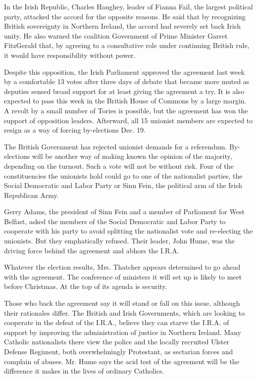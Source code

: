 In the Irish Republic, Charles Haughey, leader of Fianna Fail, the
largest political party, attacked the accord for the opposite reasons.
He said that by recognizing British sovereignty in Northern Ireland, the
accord had severely set back Irish unity. He also warned the coalition
Government of Prime Minister Garret FitzGerald that, by agreeing to a
consultative role under continuing British rule, it would have
responsibility without power.

Despite this opposition, the Irish Parliament approved the agreement
last week by a comfortable 13 votes after three days of debate that
became more muted as deputies sensed broad support for at least giving
the agreement a try. It is also expected to pass this week in the
British House of Commons by a large margin. A revolt by a small number
of Tories is possible, but the agreement has won the support of
opposition leaders. Afterward, all 15 unionist members are expected to
resign as a way of forcing by-elections Dec. 19.

The British Government has rejected unionist demands for a referendum.
By-elections will be another way of making known the opinion of the
majority, depending on the turnout. Such a vote will not be without
risk. Four of the constituencies the unionists hold could go to one of
the nationalist parties, the Social Democratic and Labor Party or Sinn
Fein, the political arm of the Irish Republican Army.

Gerry Adams, the president of Sinn Fein and a member of Parliament for
West Belfast, asked the members of the Social Democratic and Labor Party
to cooperate with his party to avoid splitting the nationalist vote and
re-electing the unionists. But they emphatically refused. Their leader,
John Hume, was the driving force behind the agreement and abhors the
I.R.A.

Whatever the election results, Mrs. Thatcher appears determined to go
ahead with the agreement. The conference of ministers it will set up is
likely to meet before Christmas. At the top of its agenda is security.

Those who back the agreement say it will stand or fall on this issue,
although their rationales differ. The British and Irish Governments,
which are looking to cooperate in the defeat of the I.R.A., believe they
can starve the I.R.A. of support by improving the administration of
justice in Northern Ireland. Many Catholic nationalists there view the
police and the locally recruited Ulster Defense Regiment, both
overwhelmingly Protestant, as sectarian forces and complain of abuses.
Mr. Hume says the acid test of the agreement will be the difference it
makes in the lives of ordinary Catholics.

